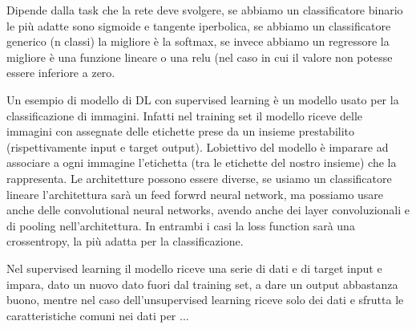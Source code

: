 
\begin{box-stud}
Dipende dalla task che la rete deve svolgere, se abbiamo un classificatore binario le più adatte sono sigmoide e tangente iperbolica, se abbiamo un classificatore generico (n classi) la migliore è la softmax, se invece abbiamo un regressore la migliore è una funzione lineare o una relu (nel caso in cui il valore non potesse essere inferiore a zero.\end{box-stud}



\begin{box-stud}
Un esempio di modello di DL con supervised learning è un modello usato per la classificazione di immagini. Infatti nel training set il modello riceve delle immagini con assegnate delle etichette prese da un insieme prestabilito (rispettivamente input e target output). Lobiettivo del modello è imparare ad associare a ogni immagine l'etichetta (tra le etichette del nostro insieme) che la rappresenta. Le architetture possono essere diverse, se usiamo un classificatore lineare l'architettura sarà un feed forwrd neural network, ma possiamo usare anche delle convolutional neural networks, avendo anche dei layer convoluzionali e di pooling nell'architettura. In entrambi i casi la loss function sarà una crossentropy, la più adatta per la classificazione.
\end{box-stud}


\begin{box-stud}
Nel supervised learning il modello riceve una serie di dati e di target input e impara, dato un nuovo dato fuori dal training set, a dare un output abbastanza buono, mentre nel caso dell'unsupervised learning riceve solo dei dati e sfrutta le caratteristiche comuni nei dati per ...
\end{box-stud}


